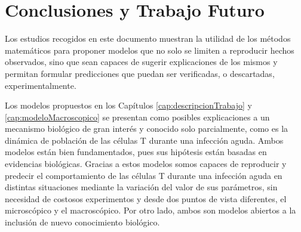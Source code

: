 \chapter{Conclusiones y Trabajo Futuro}
\label{cap:conclusiones}



Los estudios recogidos en este documento muestran la utilidad de los métodos matemáticos para proponer modelos que no solo se limiten a reproducir hechos observados, sino  que sean capaces de sugerir explicaciones de los mismos y permitan formular predicciones que puedan ser verificadas, o descartadas, experimentalmente. 

Los modelos propuestos en los Capítulos \ref{cap:descripcionTrabajo} y \ref{cap:modeloMacroscopico} se presentan como posibles explicaciones a un mecanismo biológico de gran interés y conocido solo parcialmente, como es la dinámica de población de las células T durante una infección aguda. Ambos modelos están bien fundamentados, pues sus hipótesis están basadas en evidencias biológicas. Gracias a estos modelos somos capaces de reproducir y predecir el comportamiento de las células T durante una infección aguda en distintas situaciones mediante la variación del valor de sus parámetros, sin necesidad de costosos experimentos y desde dos puntos de vista diferentes, el microscópico y el macroscópico. Por otro lado, ambos son modelos abiertos a la inclusión de nuevo conocimiento biológico. 


